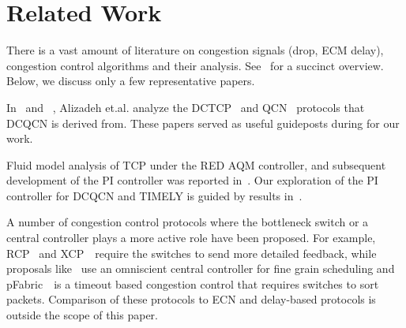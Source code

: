 \section{Related Work}
\label{sec:related}

There is a vast amount of literature on congestion signals (drop, ECM delay),
congestion control algorithms and their analysis. See~\cite{srikantbook} for a
succinct overview. Below, we discuss only a few representative papers.

In~\cite{dctcp-analysis} and ~\cite{qcn-analysis}, Alizadeh et.al. analyze the
DCTCP~\cite{dctcp} and QCN~\cite{qcn} protocols that DCQCN is derived from.
These papers served as useful guideposts during for our work.

Fluid model analysis of TCP under the RED AQM controller, and subsequent
development of the PI controller was reported
in~\cite{misra2000fluid,hollot2001designing}. Our exploration of the PI
controller for DCQCN and TIMELY is guided by results
in~\cite{hollot2001designing}.

A number of congestion control protocols where the bottleneck switch or a
central controller plays a more active role have been proposed.  For example,
RCP~\cite{dukkipati2006rcp} and XCP~\cite{katabi2002congestion}~require the
switches to send more detailed feedback, while proposals
like~\cite{vattikonda2012practical,deadline,perry2014fastpass} use an omniscient
central controller for fine grain scheduling and pFabric~\cite{pfabric}~is a
timeout based congestion control that requires switches to sort packets.
Comparison of these protocols to ECN and delay-based protocols is outside the
scope of this paper.



